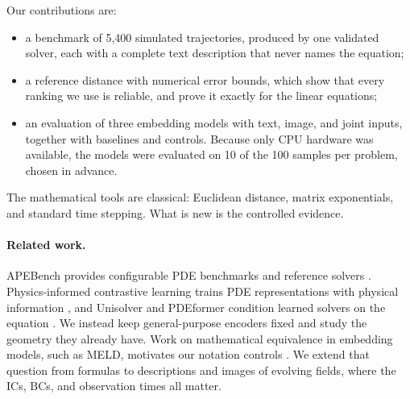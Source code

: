 Our contributions are:
\begin{itemize}[leftmargin=*,itemsep=1pt,topsep=2pt]
\item a benchmark of 5,400 simulated trajectories, produced by one validated solver, each with a complete text description that never names the equation;
\item a reference distance with numerical error bounds, which show that every ranking we use is reliable, and prove it exactly for the linear equations;
\item an evaluation of three embedding models with text, image, and joint inputs, together with baselines and controls. Because only CPU hardware was available, the models were evaluated on 10 of the 100 samples per problem, chosen in advance.
\end{itemize}
The mathematical tools are classical: Euclidean distance, matrix exponentials, and standard time stepping. What is new is the controlled evidence.

\paragraph{Related work.}
APEBench provides configurable PDE benchmarks and reference solvers \citep{koehler2024apebench}. Physics-informed contrastive learning trains PDE representations with physical information \citep{lorsung2024picl}, and Unisolver and PDEformer condition learned solvers on the equation \citep{zhou2025unisolver,ye2024pdeformer}. We instead keep general-purpose encoders fixed and study the geometry they already have. Work on mathematical equivalence in embedding models, such as MELD, motivates our notation controls \citep{ye2026meld}. We extend that question from formulas to descriptions and images of evolving fields, where the ICs, BCs, and observation times all matter.
